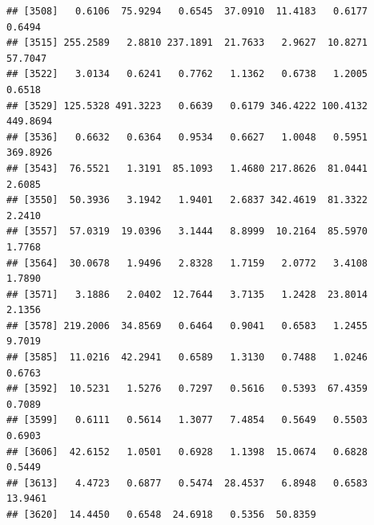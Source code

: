 \documentclass{article}\usepackage[]{graphicx}\usepackage[]{color}
\makeatletter
\newenvironment{kframe}{%
 \def\at@end@of@kframe{}%
 \ifinner\ifhmode%
  \def\at@end@of@kframe{\end{minipage}}%
  \begin{minipage}{\columnwidth}%
 \fi\fi%
 \def\FrameCommand##1{\hskip\@totalleftmargin \hskip-\fboxsep
 \colorbox{shadecolor}{##1}\hskip-\fboxsep
     \hskip-\linewidth \hskip-\@totalleftmargin \hskip\columnwidth}%
 \MakeFramed {\advance\hsize-\width
   \@totalleftmargin\z@ \linewidth\hsize
   \@setminipage}}%
 {\par\unskip\endMakeFramed%
 \at@end@of@kframe}
\newenvironment{knitrout}{}{} %
\makeatother
\begin{document}
\begin{knitrout}
\begin{kframe}
\begin{verbatim}
## [3508]   0.6106  75.9294   0.6545  37.0910  11.4183   0.6177   0.6494
## [3515] 255.2589   2.8810 237.1891  21.7633   2.9627  10.8271  57.7047
## [3522]   3.0134   0.6241   0.7762   1.1362   0.6738   1.2005   0.6518
## [3529] 125.5328 491.3223   0.6639   0.6179 346.4222 100.4132 449.8694
## [3536]   0.6632   0.6364   0.9534   0.6627   1.0048   0.5951 369.8926
## [3543]  76.5521   1.3191  85.1093   1.4680 217.8626  81.0441   2.6085
## [3550]  50.3936   3.1942   1.9401   2.6837 342.4619  81.3322   2.2410
## [3557]  57.0319  19.0396   3.1444   8.8999  10.2164  85.5970   1.7768
## [3564]  30.0678   1.9496   2.8328   1.7159   2.0772   3.4108   1.7890
## [3571]   3.1886   2.0402  12.7644   3.7135   1.2428  23.8014   2.1356
## [3578] 219.2006  34.8569   0.6464   0.9041   0.6583   1.2455   9.7019
## [3585]  11.0216  42.2941   0.6589   1.3130   0.7488   1.0246   0.6763
## [3592]  10.5231   1.5276   0.7297   0.5616   0.5393  67.4359   0.7089
## [3599]   0.6111   0.5614   1.3077   7.4854   0.5649   0.5503   0.6903
## [3606]  42.6152   1.0501   0.6928   1.1398  15.0674   0.6828   0.5449
## [3613]   4.4723   0.6877   0.5474  28.4537   6.8948   0.6583  13.9461
## [3620]  14.4450   0.6548  24.6918   0.5356  50.8359
\end{verbatim}
\end{kframe}
\end{knitrout}
\end{document}
